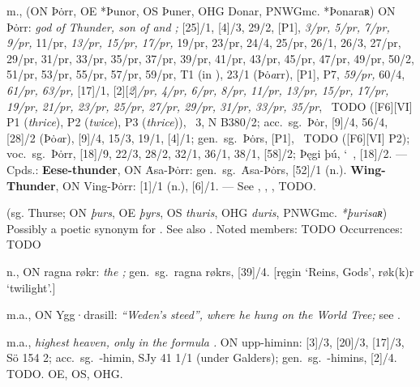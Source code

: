 \begin{itemize}
 m., (ON Þȯrr, OE *Þunor, OS Þuner, OHG Donar, PNWGmc. *Þonaraʀ)
  ON Þȯrr: \emph{god of Thunder, son of  and ;} [25]/1, [4]/3, 29/2, [P1], \emph{3/pr, 5/pr, 7/pr, 9/pr,} 11/pr, \emph{13/pr, 15/pr, 17/pr,} 19/pr, 23/pr, 24/4, 25/pr, 26/1, 26/3, 27/pr, 29/pr, 31/pr, 33/pr, 35/pr, 37/pr, 39/pr, 41/pr, 43/pr, 45/pr, 47/pr, 49/pr, 50/2, 51/pr, 53/pr, 55/pr, 57/pr, 59/pr,  T1 (in \Regius), 23/1 (Þȯ\emph{a}rr), [P1], P7, \emph{59/pr,} 60/4, \emph{61/pr, 63/pr,} %
  [17]/1, [2][\emph{2}]\emph{/pr, 4/pr, 6/pr, 8/pr, 11/pr, 13/pr, 15/pr, 17/pr, 19/pr, 21/pr, 23/pr, 25/pr, 27/pr, 29/pr, 31/pr, 33/pr, 35/pr}, \Skaldskaparmal\ TODO ([F6][VI] P1 (\emph{thrice}), P2 (\emph{twice}), P3 (\emph{thrice})), \CanterburyGalder\ 3, N B380/2; %
  acc.~sg.~Þȯr, [9]/4, 56/4, [28]/2 (Þȯ\emph{a}r), [9]/4, 15/3, 19/1, [4]/1;
  gen.~sg.~Þȯrs, [P1], \Skaldskaparmal\ TODO ([F6][VI] P2);
  voc.~sg.~Þȯrr, [18]/9, 22/3, 28/2, 32/1, 36/1, 38/1, [58]/2; Þęgi þú, \char`~, [18]/2. ---
  Cpds.: \textbf{Eese-thunder}, ON Ȧsa-Þȯrr: gen.~sg.~Ȧsa-Þȯrs, [52]/1 (n.).  \textbf{Wing-Thunder}, ON Ving-Þȯrr: [1]/1 (n.), [6]/1. --- See , , , TODO.

 (sg. Thurse; ON \emph{þurs}, OE \emph{þyrs}, OS \emph{thuris}, OHG \emph{duris}, PNWGmc. \emph{*þurisaʀ})
  Possibly a poetic synonym for . See also .
  Noted members: TODO
  Occurrences: TODO

 n., ON ragna røkr:
  \emph{the ;} gen.~sg.~ragna røkrs, [39]/4.
  [ręgin ‘Reins, Gods’, røk(k)r ‘twilight’.]

 m.a., ON Ygg·drasill:
  \emph{“Weden’s steed”, where he hung on the World Tree;} see .

 m.a.,
  \emph{highest heaven, only in the formula .}
  ON upp-himinn: [3]/3, [20]/3, [17]/3, Sö 154 2; acc.~sg.~-himin, SJy 41 1/1 (under Galders); gen.~sg.~-himins, [2]/4.
  TODO. OE, OS, OHG.


\end{itemize}
